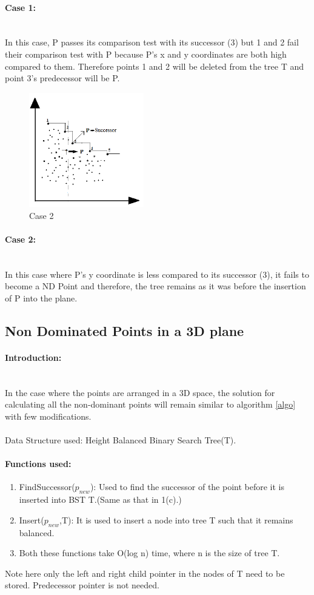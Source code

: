 \documentclass[pdftex,a4paper,12pt]{report}
\begin{document}
\paragraph{Case 1:} \makebox[2pt]{}\\
In this case, P passes its comparison test with its successor (3) but 1 and 2 fail their comparison test
with P because P’s x and y coordinates are both high compared to them. Therefore points 1 and 2 will be deleted
from the tree T and point 3’s predecessor will be P.\\
\begin{figure}[ht!]
\centering
\includegraphics[width=50mm]{p12.png}
\caption{Case 2}
\label{fig2}
\end{figure}
\paragraph{Case 2:} \makebox[2pt]{}\\
In this case where P's y coordinate is less compared to its successor (3), it fails to become a ND Point
and therefore, the tree remains as it was before the insertion of P into the plane.

\newpage
\subsection{Non Dominated Points in a 3D plane}
\paragraph{Introduction:} \makebox[2pt]{}\\
In the case where the points are arranged  in a 3D space, the solution
for calculating all the non-dominant points will remain similar to algorithm \ref{algo} with few modifications.\\\\
Data Structure used: Height Balanced Binary Search Tree(T).
\paragraph{Functions used:}
\begin{enumerate}
 \item 
 FindSuccessor($p_{new}$): Used to find the successor of the point before it is inserted into BST T.(Same as that in 1(c).)
 \item
 Insert($p_{new}$,T): It is used to insert a node into tree T such that it remains balanced.
 \item
 Both these functions take O(log n) time, where n is the size of tree T. 
\end{enumerate}
Note here only the left and right child pointer in the nodes of T need to be stored. Predecessor pointer
is not needed.
\end{document}
